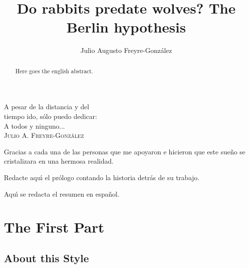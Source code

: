 \documentclass[11pt,spanish]{report}
\begin{document}
\title{Do rabbits predate wolves? The Berlin hypothesis}
\author{Julio Augusto Freyre-Gonz\'{a}lez}
\maketitle

\begin{dedication}
A pesar de la distancia y del\\
tiempo ido, s\'{o}lo puedo dedicar:\\
A todos y ninguno...\\
\textsc{Julio A. Freyre-Gonz\'{a}lez}
\end{dedication}

\begin{acknowledgements}
Gracias a cada una de las personas que me apoyaron e hicieron que
este sue\~{n}o se cristalizara en una hermosa realidad.
\end{acknowledgements}

\tableofcontents
\clearpage

\begin{foreword}
Redacte aqu\'{\i} el pr\'{o}logo contando la historia detr\'{a}s de su
trabajo.
\end{foreword}

\begin{resumen}
Aqu\'{\i} se redacta el resumen en espa\~{n}ol.
\end{resumen}

\begin{abstract}
Here goes the english abstract.
\end{abstract}


\part{The First Part}

\chapter{About this Style}
\end{document}
